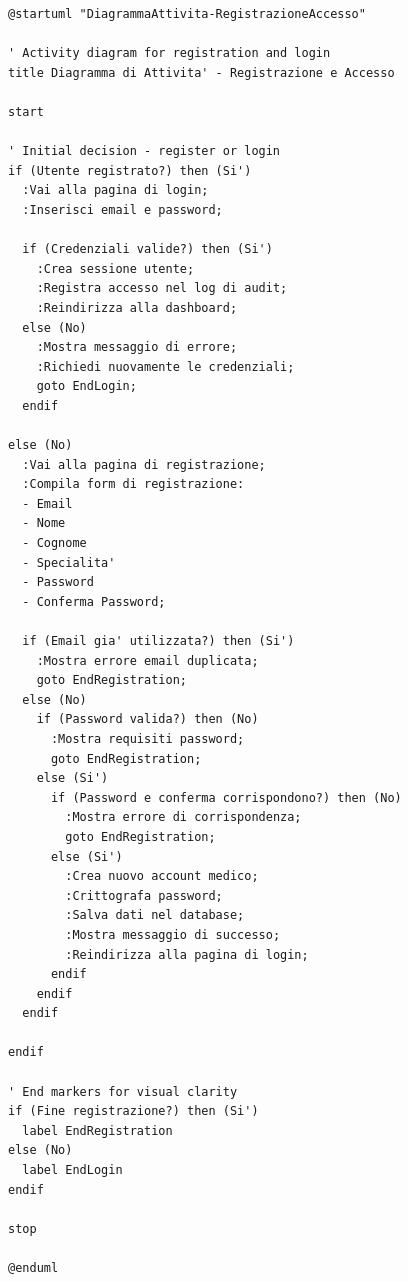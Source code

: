 \documentclass[12pt,a4paper,oneside]{report}
\begin{document}
\begin{lstlisting}[basicstyle=\small\ttfamily, breaklines=true, caption={registrazione e accesso}]
@startuml "DiagrammaAttivita-RegistrazioneAccesso"

' Activity diagram for registration and login
title Diagramma di Attivita' - Registrazione e Accesso

start

' Initial decision - register or login
if (Utente registrato?) then (Si')
  :Vai alla pagina di login;
  :Inserisci email e password;
  
  if (Credenziali valide?) then (Si')
    :Crea sessione utente;
    :Registra accesso nel log di audit;
    :Reindirizza alla dashboard;
  else (No)
    :Mostra messaggio di errore;
    :Richiedi nuovamente le credenziali;
    goto EndLogin;
  endif
  
else (No)
  :Vai alla pagina di registrazione;
  :Compila form di registrazione:
  - Email
  - Nome
  - Cognome
  - Specialita'
  - Password
  - Conferma Password;
  
  if (Email gia' utilizzata?) then (Si')
    :Mostra errore email duplicata;
    goto EndRegistration;
  else (No)
    if (Password valida?) then (No)
      :Mostra requisiti password;
      goto EndRegistration;
    else (Si')
      if (Password e conferma corrispondono?) then (No)
        :Mostra errore di corrispondenza;
        goto EndRegistration;
      else (Si')
        :Crea nuovo account medico;
        :Crittografa password;
        :Salva dati nel database;
        :Mostra messaggio di successo;
        :Reindirizza alla pagina di login;
      endif
    endif
  endif
  
endif

' End markers for visual clarity
if (Fine registrazione?) then (Si')
  label EndRegistration
else (No)
  label EndLogin
endif

stop

@enduml

\end{lstlisting}
\end{document}
